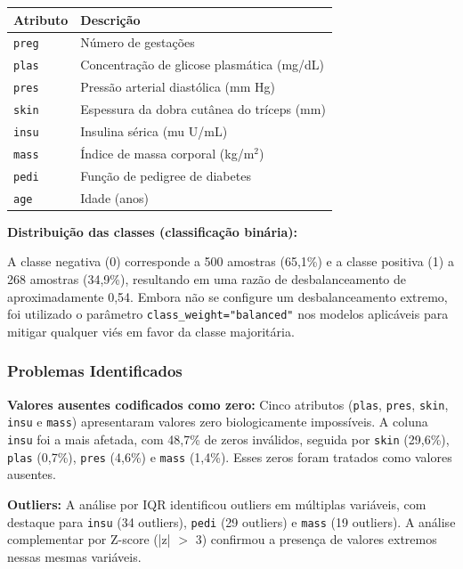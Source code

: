 \documentclass[12pt]{article}
\begin{document}
\begin{table}[ht]
\centering
\begin{tabularx}{\textwidth}{|l|X|}
\hline
Atributo & Descrição \\
\hline
\texttt{preg} & Número de gestações \\
\hline
\texttt{plas} & Concentração de glicose plasmática (mg/dL) \\
\hline
\texttt{pres} & Pressão arterial diastólica (mm Hg) \\
\hline
\texttt{skin} & Espessura da dobra cutânea do tríceps (mm) \\
\hline
\texttt{insu} & Insulina sérica (mu U/mL) \\
\hline
\texttt{mass} & Índice de massa corporal (kg/m$^2$) \\
\hline
\texttt{pedi} & Função de pedigree de diabetes \\
\hline
\texttt{age} & Idade (anos) \\
\hline
\end{tabularx}
\end{table}


\textbf{Distribuição das classes (classificação binária):}

A classe negativa (0) corresponde a 500 amostras (65,1\%) e a classe positiva (1) a 268 amostras (34,9\%), resultando em uma razão de desbalanceamento de aproximadamente 0,54. Embora não se configure um desbalanceamento extremo, foi utilizado o parâmetro \texttt{class\_weight="balanced"} nos modelos aplicáveis para mitigar qualquer viés em favor da classe majoritária.

\subsubsection{Problemas Identificados}

\textbf{Valores ausentes codificados como zero:} Cinco atributos (\texttt{plas}, \texttt{pres}, \texttt{skin}, \texttt{insu} e \texttt{mass}) apresentaram valores zero biologicamente impossíveis. A coluna \texttt{insu} foi a mais afetada, com 48,7\% de zeros inválidos, seguida por \texttt{skin} (29,6\%), \texttt{plas} (0,7\%), \texttt{pres} (4,6\%) e \texttt{mass} (1,4\%). Esses zeros foram tratados como valores ausentes.

\textbf{Outliers:} A análise por IQR identificou outliers em múltiplas variáveis, com destaque para \texttt{insu} (34 outliers), \texttt{pedi} (29 outliers) e \texttt{mass} (19 outliers). A análise complementar por Z-score (|z| $>$ 3) confirmou a presença de valores extremos nessas mesmas variáveis.
\end{document}
